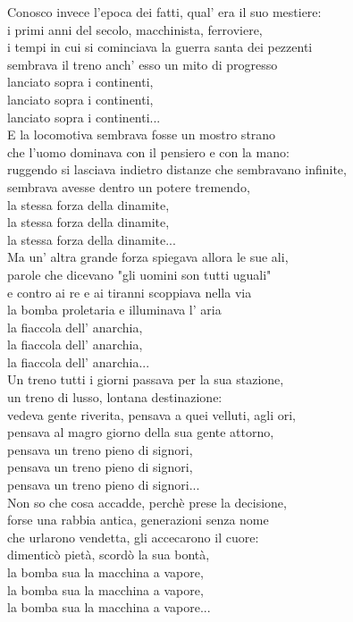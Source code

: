 \documentclass[10pt, twoside, a4paper]{article}
\begin{document}
Conosco invece l'epoca dei fatti, qual' era il suo mestiere:\\
i primi anni del secolo, macchinista, ferroviere,\\
i tempi in cui si cominciava la guerra santa dei pezzenti\\
sembrava il treno anch' esso un mito di progresso\\
lanciato sopra i continenti,\\
lanciato sopra i continenti,\\
lanciato sopra i continenti...\\

E la locomotiva sembrava fosse un mostro strano\\
che l'uomo dominava con il pensiero e con la mano:\\
ruggendo si lasciava indietro distanze che sembravano infinite,\\
sembrava avesse dentro un potere tremendo,\\
la stessa forza della dinamite,\\
la stessa forza della dinamite,\\
la stessa forza della dinamite...\\

Ma un' altra grande forza spiegava allora le sue ali,\\
parole che dicevano "gli uomini son tutti uguali"\\
e contro ai re e ai tiranni scoppiava nella via\\
la bomba proletaria e illuminava l' aria\\
la fiaccola dell' anarchia,\\
la fiaccola dell' anarchia,\\
la fiaccola dell' anarchia...\\

Un treno tutti i giorni passava per la sua stazione,\\
un treno di lusso, lontana destinazione:\\
vedeva gente riverita, pensava a quei velluti, agli ori,\\
pensava al magro giorno della sua gente attorno,\\
pensava un treno pieno di signori,\\
pensava un treno pieno di signori,\\
pensava un treno pieno di signori...\\

Non so che cosa accadde, perchè prese la decisione,\\
forse una rabbia antica, generazioni senza nome\\
che urlarono vendetta, gli accecarono il cuore:\\
dimenticò pietà, scordò la sua bontà,\\
la bomba sua la macchina a vapore,\\
la bomba sua la macchina a vapore,\\
la bomba sua la macchina a vapore...\\
\end{document}

